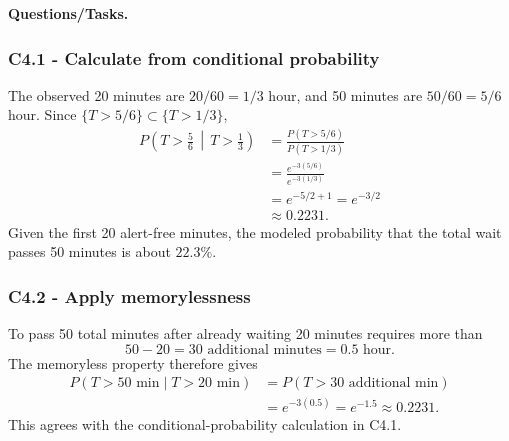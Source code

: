 \textbf{Questions/Tasks.}
\begin{enumerate}
\end{enumerate}

\subsubsection*{C4.1 - Calculate from conditional probability}\label{subsec:c4-memory-tourism-a}
The observed 20 minutes are $20/60=1/3$ hour, and 50 minutes are
$50/60=5/6$ hour.  Since $\{T>5/6\}\subset\{T>1/3\}$,
\[
\begin{aligned}
 P\left(T>\frac56\,\middle|\,T>\frac13\right)
 &=\frac{P(T>5/6)}{P(T>1/3)}\\
 &=\frac{e^{-3(5/6)}}{e^{-3(1/3)}}\\
 &=e^{-5/2+1}=e^{-3/2}\\
 &\approx0.2231.
\end{aligned}
\]
Given the first 20 alert-free minutes, the modeled probability that the total
wait passes 50 minutes is about $22.3\%$.

\subsubsection*{C4.2 - Apply memorylessness}\label{subsec:c4-memory-tourism-b}
To pass 50 total minutes after already waiting 20 minutes requires more than
\[
 50-20=30\text{ additional minutes}=0.5\text{ hour}.
\]
The memoryless property therefore gives
\[
\begin{aligned}
 P(T>50\text{ min}\mid T>20\text{ min})
 &=P(T>30\text{ additional min})\\
 &=e^{-3(0.5)}=e^{-1.5}\approx0.2231.
\end{aligned}
\]
This agrees with the conditional-probability calculation in C4.1.

